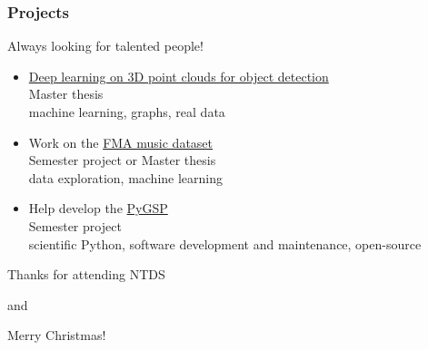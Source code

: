 \documentclass{beamer}
\begin{document}

\begin{frame}
	\frametitle{Projects}
	\begin{center}
		Always looking for talented people!
	\end{center}
	\vfill
	\begin{itemize}
		\item \href{https://lts2.epfl.ch/projects/67}{Deep learning on 3D point clouds for object detection}
			\\ {\footnotesize Master thesis}
			\\ {\footnotesize machine learning, graphs, real data}
		\vfill
		\item Work on the \href{https://github.com/mdeff/fma/}{FMA music dataset}
			\\ {\footnotesize Semester project or Master thesis}
			\\ {\footnotesize data exploration, machine learning}
		\vfill
		\item Help develop the \href{https://github.com/epfl-lts2/pygsp}{PyGSP}
			\\ {\footnotesize Semester project}
			\\ {\footnotesize scientific Python, software development and maintenance, open-source}
	\end{itemize}
\end{frame}


\begin{frame}
	\Huge{\centerline{Thanks for attending NTDS}}
	\vfill
	\Huge{\centerline{and}}
	\vfill
	\Huge{\centerline{Merry Christmas!}}
\end{frame}

\end{document}

